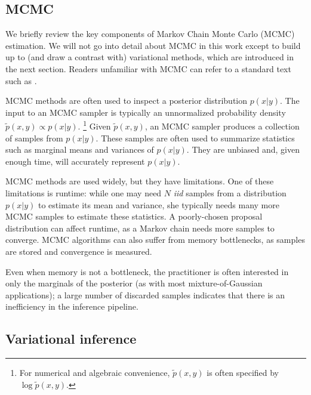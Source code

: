 \subsection{MCMC}


We briefly review the key components of Markov Chain Monte Carlo
(MCMC) estimation.  We will not go into detail about MCMC in this work
except to build up to (and draw a contrast with) variational methods,
which are introduced in the next section. Readers unfamiliar with MCMC
can refer to a standard text such as \cite{bishop:2006}.


MCMC methods are often used to inspect a posterior distribution $p(x |
y)$.  The input to an MCMC sampler is typically an unnormalized
probability density $\tilde p(x, y) \propto p(x | y)$. \footnote{For
  numerical and algebraic convenience, $\tilde p(x, y)$ is often
  specified by $\log \tilde p(x, y)$.}  Given $\tilde p(x, y)$, an
MCMC sampler produces a collection of samples from $p(x | y)$.  These
samples are often used to summarize statistics such as marginal means
and variances of $p(x | y)$.  They are unbiased and, given enough
time, will accurately represent $p(x | y)$.

MCMC methods are used widely, but they have limitations.
One of these limitations is runtime: while one may need $N$ \emph{iid}
samples from a distribution $p(x | y)$ to estimate its mean and
variance, she typically needs many more MCMC samples to estimate these
statistics.  A poorly-chosen proposal distribution can affect runtime,
as a Markov chain needs more samples to converge. MCMC algorithms can
also suffer from memory bottlenecks, as samples are stored and
convergence is measured.

Even when memory is not a bottleneck, the practitioner is often
interested in only the marginals of the posterior (as with most
mixture-of-Gaussian applications); a large number of discarded samples
indicates that there is an inefficiency in the inference pipeline.

\subsection{Variational inference}
\label{sec:variational_inference}

